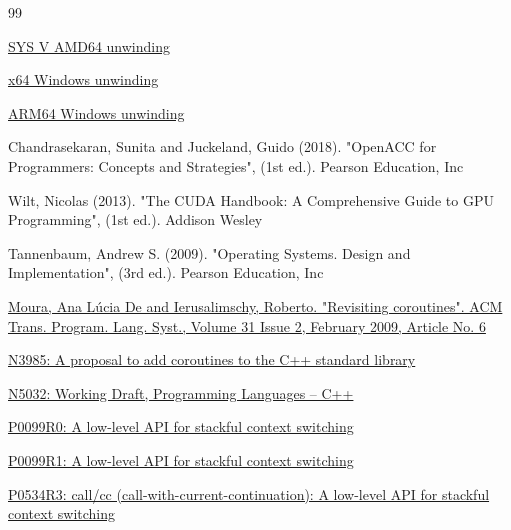 \newpage
{}
\begin{thebibliography}{99}

        \href{https://software.intel.com/sites/default/files/article/402129/mpx-linux64-abi.pdf}{SYS V AMD64 unwinding}

        \href{https://docs.microsoft.com/en-us/cpp/build/exception-handling-x64?view=vs-2019}{x64 Windows unwinding}

        \href{https://docs.microsoft.com/en-us/cpp/build/arm64-exception-handling?view=vs-2019}{ARM64 Windows unwinding}

        {Chandrasekaran, Sunita and Juckeland, Guido (2018). "OpenACC for Programmers: Concepts and Strategies", (1st ed.).
         Pearson Education, Inc}

        {Wilt, Nicolas (2013). "The CUDA Handbook: A Comprehensive Guide to GPU Programming", (1st ed.).
         Addison Wesley}

        {Tannenbaum, Andrew S. (2009). "Operating Systems. Design and Implementation", (3rd ed.).
         Pearson Education, Inc}

        \href{http://www.inf.puc-rio.br/~roberto/docs/MCC15-04.pdf}
        {Moura, Ana L\'{u}cia De and Ierusalimschy, Roberto. "Revisiting coroutines".
         ACM Trans. Program. Lang. Syst., Volume 31 Issue 2, February 2009, Article No. 6}

        \href{http://isocpp.org/files/papers/n3985.pdf}
        {N3985: A proposal to add coroutines to the C++ standard library}

        \href{https://www.open-std.org/jtc1/sc22/wg21/docs/papers/2025/n5032.pdf}
        {N5032: Working Draft, Programming Languages -- C++}

        \href{http://www.open-std.org/jtc1/sc22/wg21/docs/papers/2015/p0099r0.pdf}
        {P0099R0: A low-level API for stackful context switching}

        \href{http://www.open-std.org/jtc1/sc22/wg21/docs/papers/2016/p0099r1.pdf}
        {P0099R1: A low-level API for stackful context switching}

        \href{http://www.open-std.org/jtc1/sc22/wg21/docs/papers/2017/p0534r3.pdf}
        {P0534R3: call/cc (call-with-current-continuation): A low-level API for stackful
        context switching}


\end{thebibliography}

